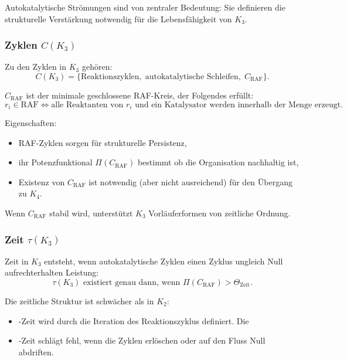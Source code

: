 Autokatalytische Strömungen sind von zentraler Bedeutung: Sie definieren die strukturelle Verstärkung
notwendig für die Lebensfähigkeit von $K_3$.

\subsubsection{Zyklen \texorpdfstring{$C(K_3)$}{C(K_3)}}

Zu den Zyklen in $K_3$ gehören:
\[
C(K_3) = \{\text{Reaktionszyklen},\;
           \text{autokatalytische Schleifen},\;
           C_{\mathrm{RAF}}\}.
\]

$C_{\mathrm{RAF}}$ ist der minimale geschlossene RAF-Kreis, der Folgendes erfüllt:
\[
r_i \in \text{RAF} \iff \text{alle Reaktanten von $r_i$ und ein Katalysator
werden innerhalb der Menge erzeugt.}
\]

Eigenschaften:
\begin{itemize}
    \item RAF-Zyklen sorgen für strukturelle Persistenz,
    \item ihr Potenzfunktional $\Pi(C_{\mathrm{RAF}})$ bestimmt
          ob die Organisation nachhaltig ist,
    \item Existenz von $C_{\mathrm{RAF}}$ ist notwendig (aber nicht
          ausreichend) für den Übergang zu $K_4$.
\end{itemize}

Wenn $C_{\mathrm{RAF}}$ stabil wird, unterstützt $K_3$ Vorläuferformen von
zeitliche Ordnung.

\subsubsection{Zeit \texorpdfstring{$\tau(K_3)$}{\tau(K_3)}}

Zeit in $K_3$ entsteht, wenn autokatalytische Zyklen einen Zyklus ungleich Null aufrechterhalten
Leistung:
\[
\tau(K_3) \text{ existiert genau dann, wenn } \Pi(C_{\mathrm{RAF}}) >
\Theta_{\mathrm{Zeit}}.
\]

Die zeitliche Struktur ist schwächer als in $K_2$:
\begin{itemize}
    Die \item-Zeit wird durch die Iteration des Reaktionszyklus definiert.
    Die \item-Zeit schlägt fehl, wenn die Zyklen erlöschen oder auf den Fluss Null abdriften.
\end{itemize}

